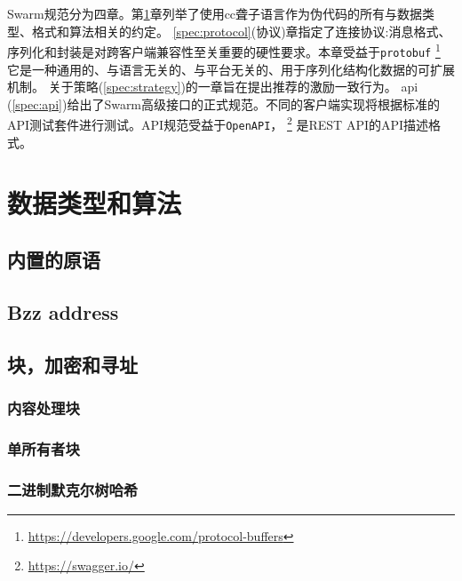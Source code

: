 
Swarm规范分为四章。第\ref{spec:convention}章列举了使用cc聋子语言作为伪代码的所有与数据类型、格式和算法相关的约定。
\ref{spec:protocol}(协议)章指定了连接协议:消息格式、序列化和封装是对跨客户端兼容性至关重要的硬性要求。本章受益于\lstinline{protobuf}
%
\footnote{\url{https://developers.google.com/protocol-buffers}}
%
它是一种通用的、与语言无关的、与平台无关的、用于序列化结构化数据的可扩展机制。
关于策略(\ref{spec:strategy})的一章旨在提出推荐的激励一致行为。
api (\ref{spec:api})给出了Swarm高级接口的正式规范。不同的客户端实现将根据标准的API测试套件进行测试。API规范受益于\lstinline{OpenAPI}，%
%
\footnote{\url{https://swagger.io/}}
%
是REST API的API描述格式。

\newpage{} 
{}
\listoftheorems[ignoreall,show={definition}]

\chapter{数据类型和算法}\label{spec:convention}

\orange{}

\section{内置的原语\statusyellow}\label{spec:format:builtin}


\section{Bzz address\statusgreen}\label{spec:format:bzzaddress}


\section{块，加密和寻址\statusyellow}
\subsection{内容处理块\statusgreen}\label{spec:format:chunks}

\subsection{单所有者块\statusgreen}\label{spec:format:soc}

\subsection{二进制默克尔树哈希\statusyellow}\label{spec:format:bmt}

